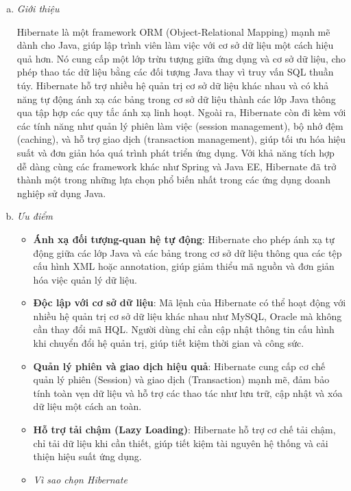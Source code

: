 \begin{enumerate}[(a)]
	\item \textit{Giới thiệu}

	      Hibernate là một framework ORM (Object-Relational Mapping) mạnh mẽ dành cho Java, giúp lập trình viên làm việc với cơ sở dữ liệu một cách hiệu quả hơn. Nó cung cấp một lớp trừu tượng giữa ứng dụng và cơ sở dữ liệu, cho phép thao tác dữ liệu bằng các đối tượng Java thay vì truy vấn SQL thuần túy. Hibernate hỗ trợ nhiều hệ quản trị cơ sở dữ liệu khác nhau và có khả năng tự động ánh xạ các bảng trong cơ sở dữ liệu thành các lớp Java thông qua tập hợp các quy tắc ánh xạ linh hoạt. Ngoài ra, Hibernate còn đi kèm với các tính năng như quản lý phiên làm việc (session management), bộ nhớ đệm (caching), và hỗ trợ giao dịch (transaction management), giúp tối ưu hóa hiệu suất và đơn giản hóa quá trình phát triển ứng dụng. Với khả năng tích hợp dễ dàng cùng các framework khác như Spring và Java EE, Hibernate đã trở thành một trong những lựa chọn phổ biến nhất trong các ứng dụng doanh nghiệp sử dụng Java.

	\item \textit{Ưu điểm}

	      \begin{itemize}
		      \item \textbf{Ánh xạ đối tượng-quan hệ tự động}: Hibernate cho phép ánh xạ tự động giữa các lớp Java và các bảng trong cơ sở dữ liệu thông qua các tệp cấu hình XML hoặc annotation, giúp giảm thiểu mã nguồn và đơn giản hóa việc quản lý dữ liệu.
		      \item \textbf{Độc lập với cơ sở dữ liệu}: Mã lệnh của Hibernate có thể hoạt động với nhiều hệ quản trị cơ sở dữ liệu khác nhau như MySQL, Oracle mà không cần thay đổi mã HQL. Người dùng chỉ cần cập nhật thông tin cấu hình khi chuyển đổi hệ quản trị, giúp tiết kiệm thời gian và công sức.
		      \item \textbf{Quản lý phiên và giao dịch hiệu quả}: Hibernate cung cấp cơ chế quản lý phiên (Session) và giao dịch (Transaction) mạnh mẽ, đảm bảo tính toàn vẹn dữ liệu và hỗ trợ các thao tác như lưu trữ, cập nhật và xóa dữ liệu một cách an toàn.
		      \item \textbf{Hỗ trợ tải chậm (Lazy Loading)}: Hibernate hỗ trợ cơ chế tải chậm, chỉ tải dữ liệu khi cần thiết, giúp tiết kiệm tài nguyên hệ thống và cải thiện hiệu suất ứng dụng.

		      \item \textit{Vì sao chọn Hibernate}


\end{itemize}
\end{enumerate}

